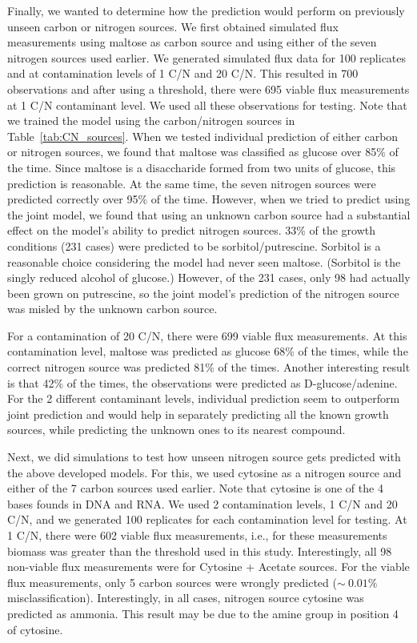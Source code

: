 \documentclass[12pt]{article}
\begin{document}
Finally, we wanted to determine how the prediction would perform on previously unseen carbon or nitrogen sources. We first obtained simulated flux measurements using maltose as carbon source and using either of the seven nitrogen sources used earlier. We generated simulated flux data for 100 replicates and at contamination levels of 1 C/N and 20 C/N. This resulted in 700 observations and after using a threshold, there were 695 viable flux measurements at 1 C/N contaminant level. We used all these observations for testing. Note that we trained the model using the carbon/nitrogen sources in Table~\ref{tab:CN_sources}. When we tested individual prediction of either carbon or nitrogen sources, we found that maltose was classified as glucose over 85\% of the time. Since maltose is a disaccharide formed from two units of glucose, this prediction is reasonable. At the same time, the seven nitrogen sources were predicted correctly over 95\% of the time. However, when we tried to predict using the joint model, we found that using an unknown carbon source had a substantial effect on the model's ability to predict nitrogen sources. 33\% of the growth conditions (231 cases) were predicted to be sorbitol/putrescine. Sorbitol is a reasonable choice considering the model had never seen maltose. (Sorbitol is the singly reduced alcohol of glucose.) However, of the 231 cases, only 98 had actually been grown on putrescine, so the joint model's prediction of the nitrogen source was misled by the unknown carbon source.

For a contamination of 20 C/N, there were 699 viable flux measurements. At this contamination level, maltose was predicted as glucose 68\% of the times, while the correct nitrogen source was predicted 81\% of the times. Another interesting result is that 42\% of the times, the observations were predicted as D-glucose/adenine. For the 2 different contaminant levels, individual prediction seem to outperform joint prediction and would help in separately predicting all the known growth sources, while predicting the unknown ones to its nearest compound.

Next, we did simulations to test how unseen nitrogen source gets predicted with the above developed models. For this, we used cytosine as a nitrogen source and either of the 7 carbon sources used earlier. Note that cytosine is one of the 4 bases founds in DNA and RNA. We used 2 contamination levels, 1 C/N and 20 C/N, and we generated 100 replicates for each contamination level for testing. At 1 C/N, there were 602 viable flux measurements, i.e., for these measurements biomass was greater than the threshold used in this study. Interestingly, all 98 non-viable flux measurements were for Cytosine + Acetate sources. For the viable flux measurements, only 5 carbon sources were wrongly predicted ($\sim~0.01\%$ misclassification). Interestingly, in all cases, nitrogen source cytosine was predicted as ammonia. This result may be due to the amine group in position 4 of cytosine.
\end{document}

